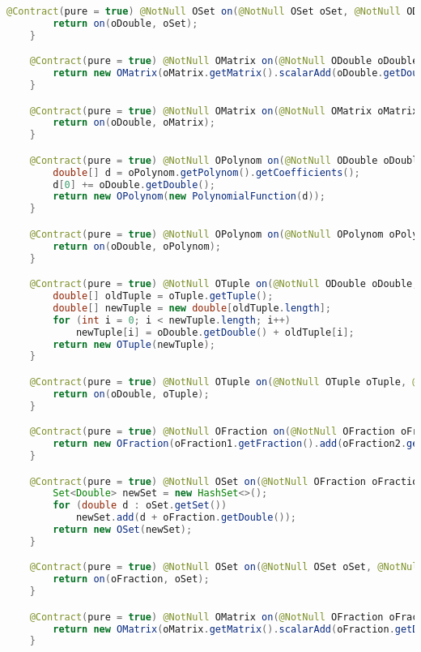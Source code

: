 \begin{lstlisting}[caption=Plus (Schwenke),label=list:Plus,language=Java]
    @Contract(pure = true) @NotNull OSet on(@NotNull OSet oSet, @NotNull ODouble oDouble) {
        return on(oDouble, oSet);
    }

    @Contract(pure = true) @NotNull OMatrix on(@NotNull ODouble oDouble, @NotNull OMatrix oMatrix) {
        return new OMatrix(oMatrix.getMatrix().scalarAdd(oDouble.getDouble()));
    }

    @Contract(pure = true) @NotNull OMatrix on(@NotNull OMatrix oMatrix, @NotNull ODouble oDouble) {
        return on(oDouble, oMatrix);
    }

    @Contract(pure = true) @NotNull OPolynom on(@NotNull ODouble oDouble, @NotNull OPolynom oPolynom) {
        double[] d = oPolynom.getPolynom().getCoefficients();
        d[0] += oDouble.getDouble();
        return new OPolynom(new PolynomialFunction(d));
    }

    @Contract(pure = true) @NotNull OPolynom on(@NotNull OPolynom oPolynom, @NotNull ODouble oDouble) {
        return on(oDouble, oPolynom);
    }

    @Contract(pure = true) @NotNull OTuple on(@NotNull ODouble oDouble, @NotNull OTuple oTuple) {
        double[] oldTuple = oTuple.getTuple();
        double[] newTuple = new double[oldTuple.length];
        for (int i = 0; i < newTuple.length; i++)
            newTuple[i] = oDouble.getDouble() + oldTuple[i];
        return new OTuple(newTuple);
    }

    @Contract(pure = true) @NotNull OTuple on(@NotNull OTuple oTuple, @NotNull ODouble oDouble) {
        return on(oDouble, oTuple);
    }

    @Contract(pure = true) @NotNull OFraction on(@NotNull OFraction oFraction1, @NotNull OFraction oFraction2) {
        return new OFraction(oFraction1.getFraction().add(oFraction2.getFraction()));
    }

    @Contract(pure = true) @NotNull OSet on(@NotNull OFraction oFraction, @NotNull OSet oSet) {
        Set<Double> newSet = new HashSet<>();
        for (double d : oSet.getSet())
            newSet.add(d + oFraction.getDouble());
        return new OSet(newSet);
    }

    @Contract(pure = true) @NotNull OSet on(@NotNull OSet oSet, @NotNull OFraction oFraction) {
        return on(oFraction, oSet);
    }

    @Contract(pure = true) @NotNull OMatrix on(@NotNull OFraction oFraction, @NotNull OMatrix oMatrix) {
        return new OMatrix(oMatrix.getMatrix().scalarAdd(oFraction.getDouble()));
    }


\end{lstlisting}
